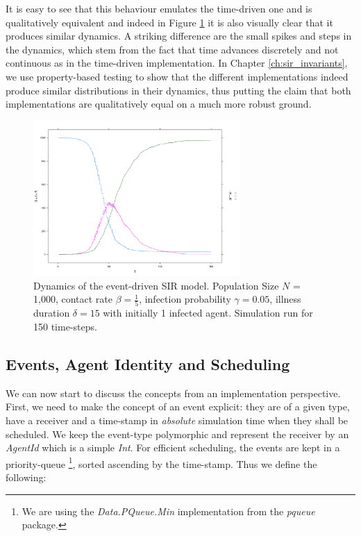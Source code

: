 \medskip

It is easy to see that this behaviour emulates the time-driven one and is qualitatively equivalent and indeed in Figure \ref{fig:sir_eventdriven_dynamics} it is also visually clear that it produces similar dynamics. A striking difference are the small spikes and steps in the dynamics, which stem from the fact that time advances discretely and not continuous as in the time-driven implementation. In Chapter \ref{ch:sir_invariants}, we use property-based testing to show that the different implementations indeed produce similar distributions in their dynamics, thus putting the claim that both implementations are qualitatively equal on a much more robust ground.

\begin{figure}
	\centering
	\includegraphics[width=0.7\textwidth, angle=0]{./fig/eventdriven/sir_eventdriven.png}
	\caption{Dynamics of the event-driven SIR model. Population Size $N$ = 1,000, contact rate $\beta = \frac{1}{5}$, infection probability $\gamma = 0.05$, illness duration $\delta = 15$ with initially 1 infected agent. Simulation run for 150 time-steps.}
	\label{fig:sir_eventdriven_dynamics}
\end{figure}

\subsection{Events, Agent Identity and Scheduling}
We can now start to discuss the concepts from an implementation perspective. First, we need to make the concept of an event explicit: they are of a given type, have a receiver and a time-stamp in \textit{absolute} simulation time when they shall be scheduled. We keep the event-type polymorphic and represent the receiver by an \textit{AgentId} which is a simple \textit{Int}. For efficient scheduling, the events are kept in a priority-queue \footnote{We are using the \textit{Data.PQueue.Min} implementation from the \textit{pqueue} package.}, sorted ascending by the time-stamp. Thus we define the following:

